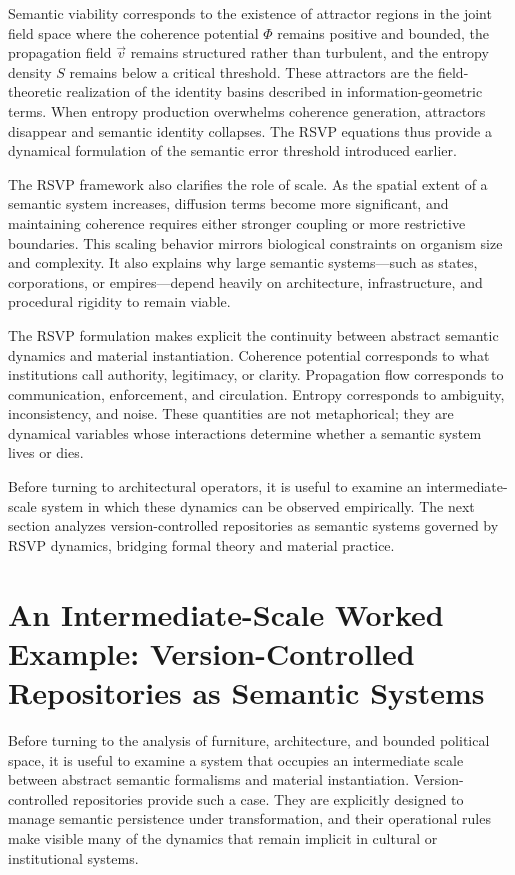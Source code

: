 \documentclass[11pt,oneside]{article}
\begin{document}
Semantic viability corresponds to the existence of attractor regions in the joint field space where the coherence potential $\Phi$ remains positive and bounded, the propagation field $\vec v$ remains structured rather than turbulent, and the entropy density $S$ remains below a critical threshold. These attractors are the field-theoretic realization of the identity basins described in information-geometric terms. When entropy production overwhelms coherence generation, attractors disappear and semantic identity collapses. The RSVP equations thus provide a dynamical formulation of the semantic error threshold introduced earlier.


The RSVP framework also clarifies the role of scale. As the spatial extent of a semantic system increases, diffusion terms become more significant, and maintaining coherence requires either stronger coupling or more restrictive boundaries. This scaling behavior mirrors biological constraints on organism size and complexity. It also explains why large semantic systems—such as states, corporations, or empires—depend heavily on architecture, infrastructure, and procedural rigidity to remain viable.

The RSVP formulation makes explicit the continuity between abstract semantic dynamics and material instantiation. Coherence potential corresponds to what institutions call authority, legitimacy, or clarity. Propagation flow corresponds to communication, enforcement, and circulation. Entropy corresponds to ambiguity, inconsistency, and noise. These quantities are not metaphorical; they are dynamical variables whose interactions determine whether a semantic system lives or dies.

Before turning to architectural operators, it is useful to examine an intermediate-scale system in which these dynamics can be observed empirically. The next section analyzes version-controlled repositories as semantic systems governed by RSVP dynamics, bridging formal theory and material practice.

\section{An Intermediate-Scale Worked Example: Version-Controlled Repositories as Semantic Systems}

Before turning to the analysis of furniture, architecture, and bounded political space, it is useful to examine a system that occupies an intermediate scale between abstract semantic formalisms and material instantiation. Version-controlled repositories provide such a case. They are explicitly designed to manage semantic persistence under transformation, and their operational rules make visible many of the dynamics that remain implicit in cultural or institutional systems.
\end{document}
